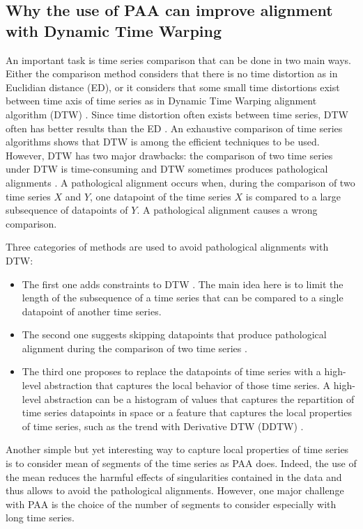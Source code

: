 \subsection{Why the use of PAA can improve alignment with Dynamic Time Warping}

An important task is time series comparison  that
can be done in two main ways.
Either the comparison method  considers that there is no time distortion as in Euclidian distance
(ED), or it considers that  some small time distortions  exist between time axis of time series as
in Dynamic Time Warping alignment algorithm (DTW)
\cite{ZhangTangDuan2015}. Since time distortion often exists between time series, DTW often has
better results than the ED \cite{UCRArchive}. An exhaustive comparison of time series algorithms
\cite{Bagnall} shows that DTW is among the efficient techniques to be used. However, DTW has two major
drawbacks:
 the comparison of two time series under DTW is time-consuming
\cite{Rakthanmanon2012} and  DTW
sometimes produces pathological alignments \cite{KeoghPazzani2001}. A
pathological alignment occurs when, during the comparison of two time  series $X$
and $Y$, one datapoint of the time series $X$ is compared to a large subsequence
of datapoints of $Y$.  A pathological alignment causes a wrong comparison.


 Three categories of methods are used to avoid pathological alignments with DTW:

\begin{itemize}
  \item The first one adds constraints to DTW \cite{RatanamahatanaKeogh2004, YuYuHuLiuWu2011, candan2012sdtw, SakoeChiba1978, jeong2011weighted}.
  The main idea here is to limit the length of the subsequence of a time series
  that can be compared to a single datapoint of another time series.
  
  \item The second one suggests skipping datapoints that
  produce pathological alignment during the comparison of two time series \cite{longin2005elastic, itakura1975minimum, MyersRabinerRosenberg1980}.
  \item The third one proposes to replace the datapoints of time
  series with a high-level abstraction that captures the local behavior of those
  time series. A high-level abstraction can be a histogram of values that
  captures the repartition of time series datapoints in space \cite{ZhangTangDuan2015} or a 
  feature that captures the local  properties of time series, such as the trend with Derivative DTW
  (DDTW) \cite{KeoghPazzani2001}.
\end{itemize}
Another simple but yet interesting way to capture local properties of time series is to consider
mean of segments of the time series as PAA does. Indeed, the use of the mean reduces the harmful
effects of singularities contained in the data and thus allows to avoid the pathological
alignments.  However, one major challenge with PAA is the choice of the number of segments to
consider especially with long time series.


